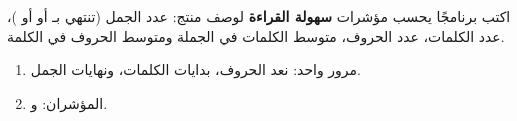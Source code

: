 \begin{statement}
اكتب برنامجًا يحسب مؤشرات \textbf{سهولة القراءة} لوصف منتج: عدد الجمل (تنتهي بـ  أو \code{!} أو )، عدد الكلمات، عدد الحروف، متوسط الكلمات في الجملة ومتوسط الحروف في الكلمة.
\end{statement}
\begin{stepsbox}\begin{enumerate}
\item مرور واحد: نعد الحروف، بدايات الكلمات، ونهايات الجمل.
\item المؤشران:  و.
\end{enumerate}\end{stepsbox}
